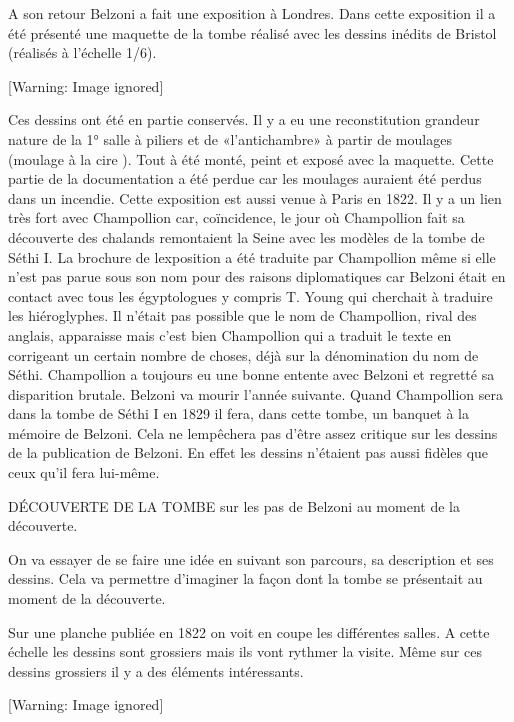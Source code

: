 \documentclass{article}
\begin{document}
A son retour Belzoni a fait une exposition à Londres. Dans cette
exposition il a été présenté une maquette de la tombe réalisé avec les
dessins inédits de Bristol (réalisés à l’échelle 1/6). 

  [Warning: Image ignored] %
 

Ces dessins ont été en partie conservés. Il y a eu une reconstitution
grandeur nature de la 1° salle à piliers et de «l’antichambre» à partir
de moulages (moulage à la cire ). Tout à été monté, peint et exposé
avec la maquette. Cette partie de la documentation a été perdue car les
moulages auraient été perdus dans un incendie.  Cette exposition est
aussi venue à Paris en 1822. Il y a un lien très fort avec Champollion
car, coïncidence,  le jour où Champollion fait sa découverte des
chalands remontaient la Seine avec les modèles de la tombe de Séthi I.
La brochure de l{\textquotesingle}exposition a été traduite par
Champollion même si elle n’est pas parue sous son nom pour des raisons
diplomatiques car Belzoni était en contact avec tous les égyptologues y
compris T. Young qui cherchait à traduire les hiéroglyphes. Il n’était
pas possible que le nom de Champollion, rival des anglais, apparaisse
mais c’est bien Champollion qui a traduit le texte en corrigeant un
certain nombre de choses, déjà sur la dénomination du nom de Séthi.
Champollion a toujours eu une bonne entente avec Belzoni et regretté sa
disparition brutale. Belzoni va mourir l’année suivante. Quand
Champollion  sera dans la tombe de Séthi I en 1829 il fera, dans cette
tombe, un banquet à la mémoire de Belzoni. Cela ne
l{\textquotesingle}empêchera pas d’être assez critique sur les dessins
de la publication de Belzoni. En effet les dessins n’étaient pas aussi
fidèles que ceux qu’il fera lui-même.

DÉCOUVERTE DE LA TOMBE  sur les pas de Belzoni  au moment de la
découverte. 

On va essayer de se faire une idée en suivant son parcours, sa
description et ses dessins. Cela va permettre d’imaginer la façon dont
la tombe se présentait au moment de la découverte.

Sur une planche publiée en 1822 on voit en coupe les différentes salles.
A cette échelle les dessins sont grossiers mais ils vont rythmer la
visite. Même sur ces dessins grossiers il y a des éléments
intéressants.

  [Warning: Image ignored] %
 
\end{document}
